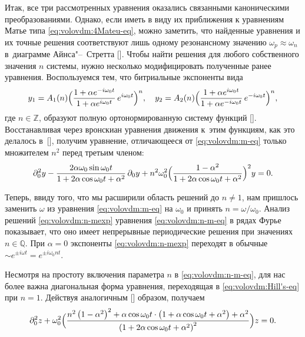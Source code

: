 Итак, все три рассмотренных уравнения оказались связанными каноническими
преобразованиями. Однако, если иметь в виду их приближения к уравнениям
Матье типа \eqref{eq:volovdm:4Mateu-eq}, можно заметить, что найденные уравнения
и их точные решения соответствуют лишь одному резонансному значению $\omega_{p}\approx\omega_{n}$ в~диаграмме Айнса"--~Стретта [].
Чтобы найти решения для любого собственного значения $n$ системы, нужно несколько модифицировать полученные ранее уравнения. Воспользуемся тем, что битриальные экспоненты вида 
\begin{equation}
y_{1}=A_{1}(n)\Bigl(\dfrac{1+\alpha e^{-i\omega_{0}t}}{1+\alpha e^{i\omega_{0}t}}\, e^{i\omega_{0}t}\Bigr)^{n}, 
\quad  
y_{2}=A_{2}(n)\Bigl(\dfrac{1+\alpha e^{i\omega_{0}t}}{1+\alpha e^{-i\omega_{0}t}}\, e^{-i\omega_{0}t}\Bigr)^{n},
\label{eq:volovdm:n-mexp}
\end{equation}
где $n\in\mathbb{Z}$, 
образуют полную ортонормированную систему функций []. 
Восстанавливая через вронскиан уравнения движения к~этим функциям, как это делалось в~[], получим уравнение, отличающееся от \eqref{eq:volovdm:m-eq} только множителем $n^{2}$ перед третьим членом: 
\begin{equation}
\partial_{0}^{2}y-\dfrac{2\alpha\omega_{0}\sin\omega_{0}t}{1+2\alpha\cos\omega_{0}t+\alpha^{2}}\,\partial_{0}y+n^{2}\omega_{0}^{2}
\Bigl(\dfrac{1-\alpha^{2}}{1+2\alpha\cos\omega_{0}t+\alpha^{2}}\Bigr)^{2}y=0.
\label{eq:volovdm:n-m-eq}
\end{equation}


Теперь, ввиду того, что мы расширили область решений до $n\neq1$,
нам пришлось заменить $\omega$ из уравнения \eqref{eq:volovdm:m-eq} на $\omega_{0}$
и принять $n=\omega/\omega_{0}$. Анализ решений \eqref{eq:volovdm:n-mexp}
уравнения \eqref{eq:volovdm:n-m-eq} в рядах Фурье показывает, что оно имеет
непрерывные периодические решения при значениях $n\in\mathbb{Q}$.
При $\alpha=0$ экспоненты \eqref{eq:volovdm:n-mexp} переходят в обычные
$\sim e^{\pm i\omega t}=e^{\pm i\omega_{0}nt}$. 

Несмотря на простоту включения параметра $n$ в \eqref{eq:volovdm:n-m-eq},
для нас более важна диагональная форма уравнения, переходящая в \eqref{eq:volovdm:Hill's-eq}
при $n=1$. Действуя аналогичным {[]} образом, получаем
\begin{equation}
\partial_{0}^{2}z+\omega_{0}^{2}
\Bigl(\dfrac{n^{2}\left(1-\alpha^{2}\right)^{2}+\alpha\cos\omega_{0}t\cdot\left(1+\alpha\cos\omega_{0}t+\alpha^{2}\right)+\alpha^{2}}{\left(1+2\alpha\cos\omega_{0}t+\alpha^{2}\right)^{2}}\Bigr)z=0.
\label{eq:volovdm:n-Hill's}
\end{equation}


